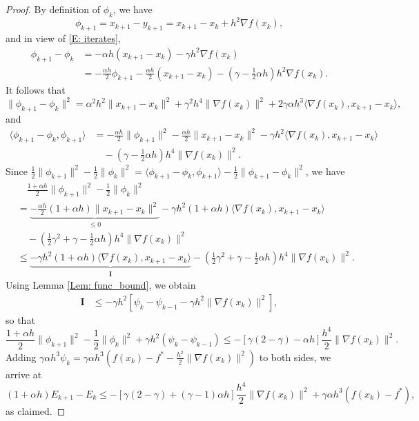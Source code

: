 \documentclass[pdflatex,sn-mathphys-num]{sn-jnl}
\theoremstyle{thmstyleone}
\theoremstyle{thmstyletwo}
\theoremstyle{thmstylethree}
\begin{document}
\begin{proof}
By definition of $\phi_k$, we have
$$ \phi_{k+1} = x_{k+1}-y_{k+1} = x_{k+1}-x_k + h^2 \nabla f(x_k), $$
and in view of \eqref{E: iterates},
\begin{align*}
\phi_{k+1} - \phi_k
&= -\alpha h ( x_{k+1} - x_k ) - \gamma h^2 \nabla f(x_k) \\
&= - \frac{\alpha h}{2}\phi_{k+1} 
   - \frac{\alpha h}{2}( x_{k+1} - x_k )
   - \left(\gamma - \frac{1}{2}\alpha h \right) h^2 \nabla f(x_k).
\end{align*}
It follows that
$$ \| \phi_{k+1} - \phi_k \|^2
= \alpha^2 h^2 \| x_{k+1} - x_k \|^2
  + \gamma^2 h^4 \| \nabla f(x_k) \|^2
  + 2\gamma\alpha h^3 \langle \nabla f(x_k), x_{k+1}-x_k \rangle, $$
and
\begin{align*}
\langle \phi_{k+1}-\phi_k, \phi_{k+1} \rangle
&= -\frac{\alpha h}{2}\| \phi_{k+1} \|^2
 - \frac{\alpha h}{2}\| x_{k+1}-x_k \|^2
 - \gamma h^2 \langle \nabla f(x_k), x_{k+1}-x_k \rangle \\
&\quad - \left( \gamma - \frac{1}{2}\alpha h \right) h^4 \| \nabla f(x_k) \|^2.
\end{align*}
Since $\frac{1}{2}\| \phi_{k+1} \|^2 - \frac{1}{2}\| \phi_k \|^2 = \langle \phi_{k+1}-\phi_k, \phi_{k+1} \rangle - \frac{1}{2}\| \phi_{k+1} - \phi_k \|^2$, we have
\begin{align*}
&\quad \frac{1+\alpha h}{2}\| \phi_{k+1} \|^2 - \frac{1}{2}\| \phi_k \|^2 \\
&= \underbrace{ - \frac{\alpha h}{2}(1+\alpha h)\| x_{k+1} - x_k \|^2 }_{\le 0}
   - \gamma h^2 (1+\alpha h) \langle \nabla f(x_k), x_{k+1}-x_k \rangle \\
&\quad - \left( \frac{1}{2}\gamma^2 + \gamma - \frac{1}{2}\alpha h \right) h^4 \| \nabla f(x_k) \|^2 \\
&\le \underbrace{ - \gamma h^2 (1+\alpha h) \langle \nabla f(x_k), x_{k+1}-x_k \rangle }_{\mathbf{I}}
    - \left( \frac{1}{2}\gamma^2 + \gamma - \frac{1}{2}\alpha h \right) h^4 \| \nabla f(x_k) \|^2.  
\end{align*}
Using Lemma \ref{Lem: func_bound}, we obtain
\begin{align*}
\mathbf{I}
&\le -\gamma h^2 \left[ \psi_k - \psi_{k-1} - \gamma h^2 \| \nabla f(x_k) \|^2 \right],
\end{align*}
so that
$$\frac{1+\alpha h}{2}\| \phi_{k+1} \|^2 - \frac{1}{2}\| \phi_k \|^2 
   + \gamma h^2 (\psi_k - \psi_{k-1}) 
\le - \left[ \gamma(2-\gamma) - \alpha h \right] \frac{h^4}{2} \| \nabla f(x_k) \|^2. $$
Adding $\gamma\alpha h^3 \psi_k = \gamma\alpha h^3\left( f(x_k) - f^* - \frac{h^2}{2}\| \nabla f(x_k) \|^2 \right)$ to both sides, we arrive at
$$ (1+\alpha h)E_{k+1}-E_k 
\le - \left[ \gamma(2-\gamma) + (\gamma-1) \alpha h \right] \frac{h^4}{2} \| \nabla f(x_k) \|^2
    + \gamma\alpha h^3 \left( f(x_k) - f^* \right), $$
as claimed.
\end{proof}
\end{document}
